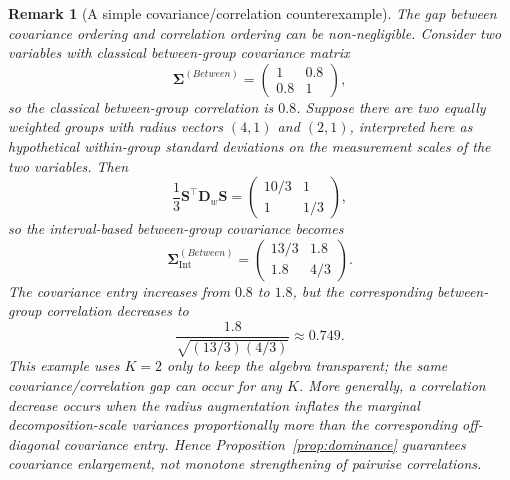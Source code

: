 \documentclass[preprint, times, 12pt, authoryear]{elsarticle}
\newtheorem{remark}{Remark}
\begin{document}
\begin{remark}[A simple covariance/correlation counterexample]
	The gap between covariance ordering and correlation ordering can be non-negligible. Consider two variables with classical between-group covariance matrix
	\[
	\boldsymbol{\Sigma}^{(Between)}
	=
	\begin{pmatrix}
		1 & 0.8\\
		0.8 & 1
	\end{pmatrix},
	\]
	so the classical between-group correlation is $0.8$. Suppose there are two equally weighted groups with radius vectors $(4,1)$ and $(2,1)$, interpreted here as hypothetical within-group standard deviations on the measurement scales of the two variables. Then
	\[
	\frac13\mathbf S^\top \mathbf D_w \mathbf S
	=
	\begin{pmatrix}
		10/3 & 1\\
		1 & 1/3
	\end{pmatrix},
	\]
	so the interval-based between-group covariance becomes
	\[
	\boldsymbol{\Sigma}_{\mathrm{Int}}^{(Between)}
	=
	\begin{pmatrix}
		13/3 & 1.8\\
		1.8 & 4/3
	\end{pmatrix}.
	\]
	The covariance entry increases from $0.8$ to $1.8$, but the corresponding between-group correlation decreases to
	\[
	\frac{1.8}{\sqrt{(13/3)(4/3)}}\approx 0.749.
	\]
	This example uses $K=2$ only to keep the algebra transparent; the same covariance/correlation gap can occur for any $K$. More generally, a correlation decrease occurs when the radius augmentation inflates the marginal decomposition-scale variances proportionally more than the corresponding off-diagonal covariance entry. Hence Proposition~\ref{prop:dominance} guarantees covariance enlargement, not monotone strengthening of pairwise correlations.
\end{remark}
\end{document}
